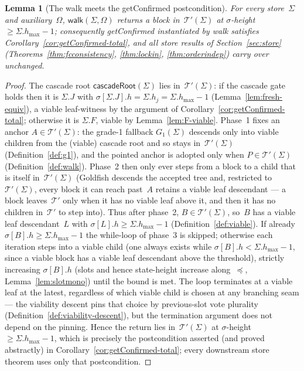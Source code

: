 \ifx\litemode\undefined\documentclass{article}\fi
\newcommand{\hmax}{\ensuremath{h_{\max}}\xspace}
\newcommand{\viableTree}{\ensuremath{\mathcal{T}'}}
\newcommand{\getConfirmed}{\textsf{getConfirmed}\xspace}
\newcommand{\Gone}{\ensuremath{G_{1}}}
\newcommand{\cascadeRoot}{\textsf{cascadeRoot}\xspace}
\newcommand{\walk}{\textsf{walk}\xspace}
\theoremstyle{plain}
\newtheorem{lemma}{Lemma}
\theoremstyle{definition}
\theoremstyle{remark}
\begin{document}
\begin{lemma}[The walk meets the \getConfirmed{} postcondition]\label{lem:walk-total}
For every store~$\Sigma$ and auxiliary~$\Omega$, $\walk(\Sigma, \Omega)$
returns a block in~$\viableTree(\Sigma)$ at $\sigma$-height
$\geq \Sigma.\hmax - 1$; consequently \getConfirmed{} instantiated by
\walk{} satisfies Corollary~\ref{cor:getConfirmed-total}, and all store
results of Section~\ref{sec:store}
(Theorems~\ref{thm:fcconsistency}, \ref{thm:lockin},
\ref{thm:orderindep}) carry over unchanged.
\end{lemma}

\begin{proof}
The cascade root $\cascadeRoot(\Sigma)$ lies in~$\viableTree(\Sigma)$: if the
cascade gate holds then it is $\Sigma.J$ with
$\sigma[\Sigma.J].h = \Sigma.h_j = \Sigma.\hmax - 1$
(Lemma~\ref{lem:fresh-equiv}), a viable leaf-witness by the argument of
Corollary~\ref{cor:getConfirmed-total}; otherwise it is $\Sigma.F$, viable by
Lemma~\ref{lem:F-viable}.  Phase~1 fixes an anchor $A \in \viableTree(\Sigma)$:
the grade-1 fallback $\Gone(\Sigma)$ descends only into viable children
from the (viable) cascade root and so stays in~$\viableTree(\Sigma)$
(Definition~\ref{def:g1}), and the pointed anchor is adopted only when
$P \in \viableTree(\Sigma)$ (Definition~\ref{def:walk}).  Phase~2 then
only ever steps from a block to a child that is itself in~$\viableTree(\Sigma)$
(Goldfish descends the accepted tree and, restricted to~$\viableTree(\Sigma)$,
every block it can reach past~$A$ retains a viable leaf descendant --- a block
leaves~$\viableTree$ only when it has no viable leaf above it, and then it has
no children in~$\viableTree$ to step into).  Thus after phase~2,
$B \in \viableTree(\Sigma)$, so~$B$ has a viable leaf descendant~$L$ with
$\sigma[L].h \geq \Sigma.\hmax - 1$
(Definition~\ref{def:viable}).  If already $\sigma[B].h \geq \Sigma.\hmax-1$
the while-loop of phase~3 is skipped; otherwise each iteration steps into a
viable child (one always exists while $\sigma[B].h < \Sigma.\hmax - 1$,
since a viable block has a viable leaf descendant above the threshold),
strictly increasing $\sigma[B].h$ (slots and hence state-height increase
along~$\preceq$, Lemma~\ref{lem:slotmono}) until the bound is met.  The loop
terminates at a viable leaf at the latest, regardless of which viable child
is chosen at any branching seam --- the viability descent pins that choice by
previous-slot vote plurality (Definition~\ref{def:viability-descent}), but the
termination argument does not depend on the pinning.  Hence the return lies
in~$\viableTree(\Sigma)$ at
$\sigma$-height $\geq \Sigma.\hmax - 1$, which is precisely the
postcondition asserted (and proved abstractly) in
Corollary~\ref{cor:getConfirmed-total}; every downstream store theorem uses
only that postcondition.
\end{proof}
\end{document}
